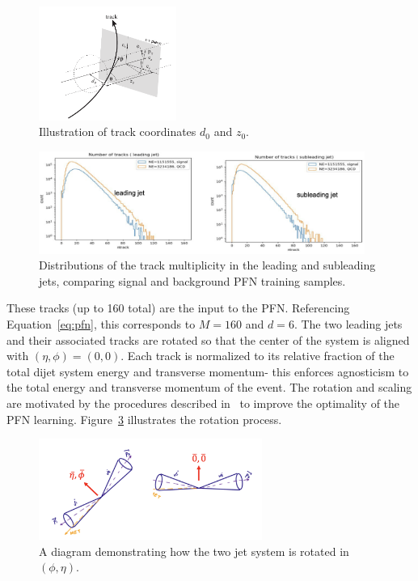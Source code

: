 \begin{figure}[!htbp]
\centering
   \includegraphics[width=0.4\textwidth]{figures/ml/trackcoordinates}
    \caption{Illustration of track coordinates $d_0$ and $z_0$.
    \label{fig:trackcoordinates}}
\end{figure}

\begin{figure}[!htbp]
\centering
   \includegraphics[width=0.95\textwidth]{figures/ml/ntracks}
    \caption{Distributions of the track multiplicity in the leading and subleading jets, comparing signal and background PFN training samples.
    \label{fig:ntracks}}
\end{figure}

These tracks (up to 160 total) are the input to the PFN. Referencing Equation~\ref{eq:pfn}, this corresponds to $M = 160$ and $d = 6$. The two leading jets and their associated tracks are rotated so that the center of the system is aligned with $(\eta,\phi) = (0,0)$. Each track is normalized to its relative fraction of the total dijet system energy and transverse momentum- this enforces agnosticism to the total energy and transverse momentum of the event. The rotation and scaling are motivated by the procedures described in~\cite{pfn} to improve the optimality of the PFN  learning. Figure~\ref{fig:jet_rotate} illustrates the rotation process.

\begin{figure}[!htbp]
\centering
   \includegraphics[width=0.65\textwidth]{figures/ml/jet_rotate}
    \caption{A diagram demonstrating how the two jet system is rotated in $(\phi,\eta)$.
    \label{fig:jet_rotate}}
\end{figure}

